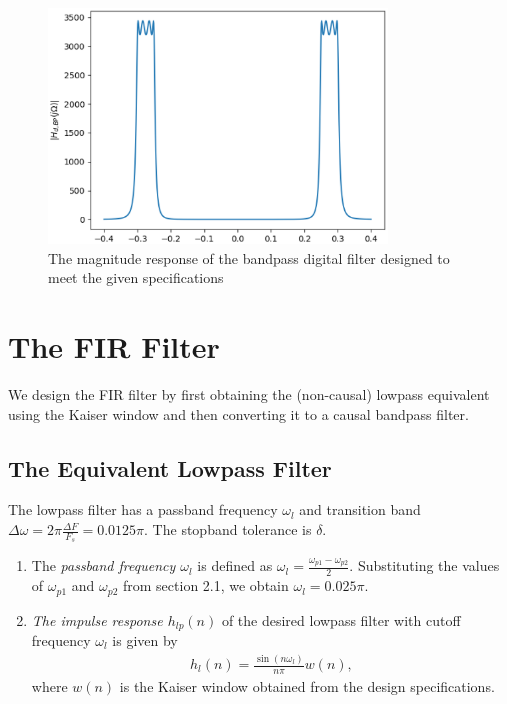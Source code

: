 \documentclass[journal,12pt,twocolumn]{IEEEtran}
\begin{document}
\begin{figure}
    \centering
    \includegraphics[width = 9cm]{./figs/iir/ee18btech11035_digital_bp.eps}
    \caption{The magnitude response of the bandpass digital filter designed to meet the given specifications}
    \label{fig:BP_digital}
\end{figure}
\section{The FIR Filter}
We design the FIR filter by first obtaining the (non-causal) lowpass equivalent using the Kaiser window
and then
converting it to a causal bandpass filter.

\subsection{The Equivalent Lowpass Filter}
The lowpass filter has a passband frequency $\omega_l$ and transition band $\Delta \omega = 2\pi \frac{\Delta F}{F_s} = 0.0125\pi$.
The stopband tolerance is $\delta$.
\begin{enumerate}
\item  The {\em passband frequency $\omega_l$}  is defined as $\omega_l = \frac{\omega_{p1} - \omega_{p2}}{2}$.  Substituting the values of $\omega_{p1}$ and $\omega_{p2}$ from section 2.1, we obtain $\omega_l = 0.025\pi$.

\item {\em The impulse response $h_{lp}(n)$} of the desired lowpass filter with cutoff frequency $\omega_l$
is given by
\begin{eqnarray}
\label{firlpdef}
h_l(n) = \frac{\sin(n\omega_l)}{n\pi}w(n),
\end{eqnarray}
where $w(n)$ is the Kaiser window obtained from the design specifications.
\end{enumerate}
\end{document}
